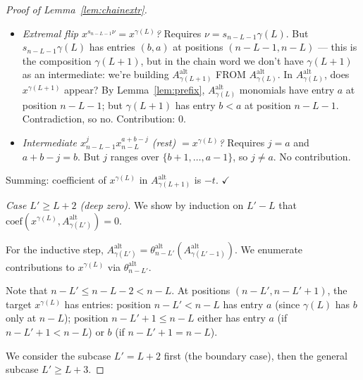 \documentclass[11pt]{article}
\newcommand{\Aalt}{A^{\mathrm{alt}}}
\newcommand{\thalt}{\theta^{\mathrm{alt}}}
\begin{document}
\begin{proof}[Proof of Lemma~\ref{lem:chainextr}]
\begin{itemize}
\item \emph{Extremal flip $x^{s_{n-L-1} \nu} = x^{\gamma(L)}$?} Requires
$\nu = s_{n-L-1} \gamma(L)$.  But $s_{n-L-1} \gamma(L)$ has entries $(b, a)$
at positions $(n-L-1, n-L)$ — this is the composition $\gamma(L+1)$, but
in the chain word we don't have $\gamma(L+1)$ as an intermediate: we're
building $\Aalt_{\gamma(L+1)}$ FROM $\Aalt_{\gamma(L)}$.  In
$\Aalt_{\gamma(L)}$, does $x^{\gamma(L+1)}$ appear?  By Lemma~\ref{lem:prefix},
$\Aalt_{\gamma(L)}$ monomials have entry $a$ at position $n-L-1$; but
$\gamma(L+1)$ has entry $b < a$ at position $n-L-1$.  Contradiction, so
no.  Contribution: $0$.

\item \emph{Intermediate $x_{n-L-1}^j x_{n-L}^{a+b-j}$ (rest) $= x^{\gamma(L)}$?}
Requires $j = a$ and $a + b - j = b$.  But $j$ ranges over
$\{b+1, \ldots, a-1\}$, so $j \ne a$.  No contribution.
\end{itemize}

Summing: coefficient of $x^{\gamma(L)}$ in $\Aalt_{\gamma(L+1)}$ is $-t$. $\checkmark$

\emph{Case $L' \ge L + 2$ (deep zero).}  We show by induction on
$L' - L$ that $\mathrm{coef}(x^{\gamma(L)}, \Aalt_{\gamma(L')}) = 0$.

For the inductive step, $\Aalt_{\gamma(L')} = \thalt_{n-L'}(\Aalt_{\gamma(L'-1)})$.
We enumerate contributions to $x^{\gamma(L)}$ via $\thalt_{n-L'}$.

Note that $n - L' \le n - L - 2 < n - L$.  At positions $(n-L', n-L'+1)$,
the target $x^{\gamma(L)}$ has entries: position $n - L' < n - L$ has entry
$a$ (since $\gamma(L)$ has $b$ only at $n-L$); position $n - L' + 1 \le n - L$
either has entry $a$ (if $n-L'+1 < n-L$) or $b$ (if $n-L'+1 = n-L$).

We consider the subcase $L' = L + 2$ first (the boundary case), then the
general subcase $L' \ge L + 3$.


\end{proof}
\end{document}
